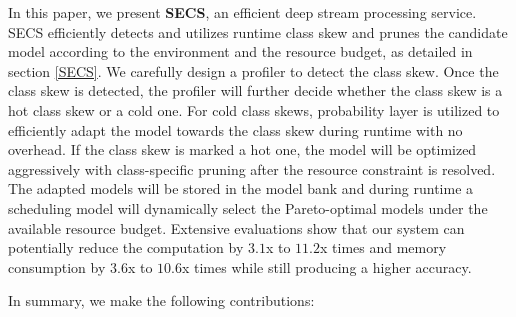 \documentclass[pageno]{jpaper}
\begin{document}

In this paper, we present \textbf{SECS}, an efficient deep stream processing service. SECS efficiently detects and utilizes runtime class skew and prunes the candidate model according to the environment and the resource budget, as detailed in section \ref{SECS}. We carefully design a profiler to detect the class skew. Once the class skew is detected, the profiler will further decide whether the class skew is a hot class skew or a cold one. For cold class skews, probability layer is utilized to efficiently adapt the model towards the class skew during runtime with no overhead. If the class skew is marked a hot one, the model will be optimized aggressively with class-specific pruning after the resource constraint is resolved. The adapted models will be stored in the model bank and during runtime a scheduling model will dynamically select the Pareto-optimal models under the available resource budget. Extensive evaluations show that our system can potentially reduce the computation by $3.1$x to $11.2$x times and memory consumption by $3.6$x to $10.6$x times while still producing a higher accuracy.

In summary, we make the following contributions:
\end{document}
